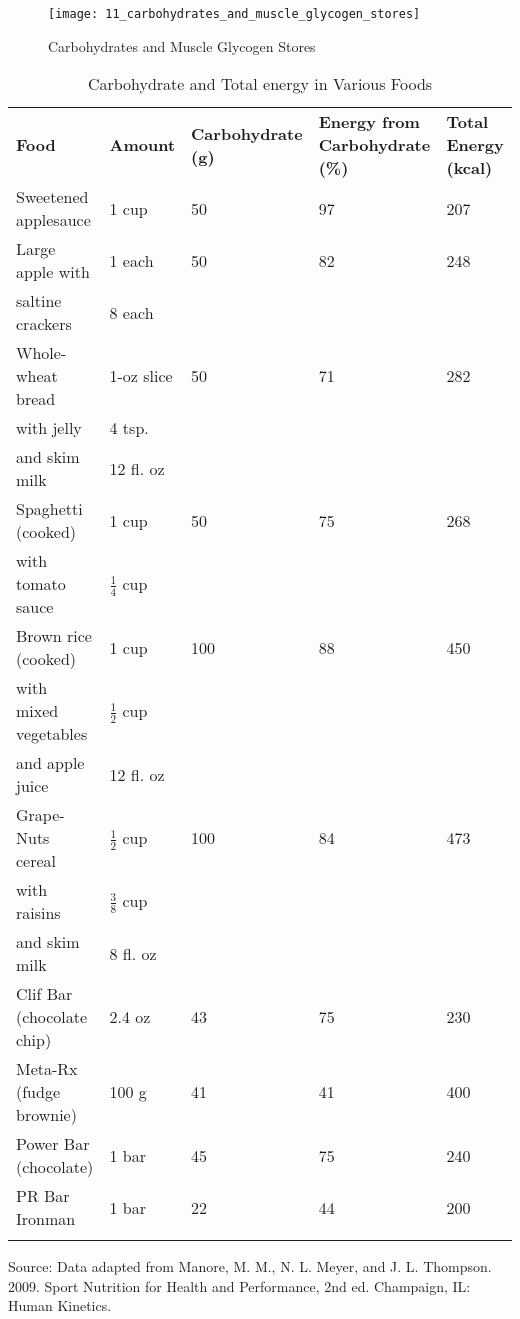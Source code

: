 \documentclass[title={Chapter 11}]{fdsn201notes}
\begin{document}
\begin{figure}[H]
	\centering
	\texttt{[image: 11\_carbohydrates\_and\_muscle\_glycogen\_stores]}
	\caption{Carbohydrates and Muscle Glycogen Stores}
	\label{fig:carbohydrates-and-muscle-glycogen-stores}
\end{figure}

\begin{table}[H]
	\centering
	\begin{threeparttable}
		\caption{Carbohydrate and Total energy in Various Foods}
		\label{tab:carbohydrate-and-total-energy-in-various-foods}
		\begin{tabular}{p{} p{}p{}p{} p{}}
			\rowcolor{rowdarkgreen}\textbf{Food} & \textbf{Amount} & \textbf{Carbohydrate (g)} & \textbf{Energy from Carbohydrate (\%)} & \textbf{Total Energy (kcal)}\\
			Sweetened applesauce & 1 cup				& 50 & 97 & 207\\
			Large apple with & 1 each					& 50 & 82 & 248\\
			saltine crackers & 8 each					& & & \\
			Whole-wheat bread & 1-oz slice				& 50 & 71 & 282\\
			with jelly & 4 tsp.							& & & \\
			and skim milk & 12 fl. oz					& & & \\
			Spaghetti (cooked) & 1 cup					& 50 & 75 & 268\\
			with tomato sauce  & $\frac{1}{4}$ cup		& & & \\
			Brown rice (cooked) & 1 cup					& 100 & 88 & 450\\
			with mixed vegetables & $\frac{1}{2}$ cup	& & & \\
			and apple juice & 12 fl. oz					& & & \\
			Grape-Nuts cereal & $\frac{1}{2}$ cup		& 100 & 84 & 473\\
			with raisins & $\frac{3}{8}$ cup			& & &\\
			and skim milk & 8 fl. oz					& & &\\
			Clif Bar (chocolate chip) & 2.4 oz			& 43 & 75 & 230\\
			Meta-Rx (fudge brownie) & 100 g				& 41 & 41 & 400\\
			Power Bar (chocolate) & 1 bar				& 45 & 75 & 240\\
			PR Bar Ironman & 1 bar						& 22 & 44 & 200\\
			\rowcolor{rowdarkgreen} & & & & \\
		\end{tabular}
		\begin{tablenotes}
			\small
			\item Source: Data adapted from Manore, M. M., N. L. Meyer, and J. L. Thompson. 2009. Sport Nutrition for Health and Performance, 2nd ed. Champaign, IL: Human Kinetics.
		\end{tablenotes}
	\end{threeparttable}
\end{table}
\end{document}
